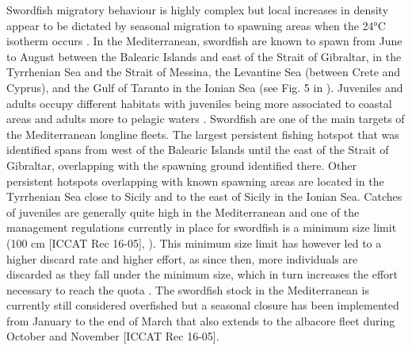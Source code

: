 Swordfish migratory behaviour is highly complex but local increases in density appear to be
dictated by seasonal migration to spawning areas when the 24°C isotherm occurs
\citep{arocha_2007,palko1981swordfish}. In the Mediterranean, swordfish are known to spawn from
June to August between the Balearic Islands and east of the Strait of Gibraltar, in the Tyrrhenian
Sea and the Strait of Messina, the Levantine Sea (between Crete and Cyprus), and the Gulf of
Taranto in the Ionian Sea (see Fig. 5 in \citealp{arocha_2007}). Juveniles and adults occupy
different habitats with juveniles being more associated to coastal areas and adults more to pelagic
waters \citep{damalas_14_swo}. Swordfish are one of the main targets of the Mediterranean longline
fleets. The largest persistent fishing hotspot that was identified spans from west of the Balearic
Islands until the east of the Strait of Gibraltar, overlapping with the spawning ground identified
there. Other persistent hotspots overlapping with known spawning areas are located in the
Tyrrhenian Sea close to Sicily and to the east of Sicily in the Ionian Sea. Catches of juveniles
are generally quite high in the Mediterranean and one of the management regulations currently in
place for swordfish is a minimum size limit (100 cm [ICCAT Rec 16-05],
\citealp{iccat_juvenile_swo_ortiz}). This minimum size limit has however led to a higher discard
rate and higher effort, as since then, more individuals are discarded as they fall under the
minimum size, which in turn increases the effort necessary to reach the quota
\citep{iccat_swo_discards}. The swordfish stock in the Mediterranean is currently still considered
overfished but a seasonal closure has been implemented from January to the end of March that also
extends to the albacore fleet during October and November [ICCAT Rec 16-05].

\medskip

